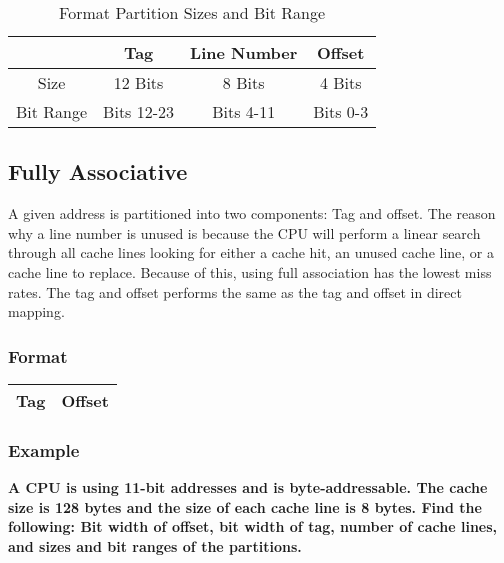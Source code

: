 \documentclass[11pt]{article}
\begin{document}
\begin{table}[H]
	\centering
	\caption*{Format Partition Sizes and Bit Range}
	\begin{tabular}{| c | c | c | c |}
		\hline
					&	Tag		&	Line Number		&	Offset\\
		\hline
		Size		&	12 Bits	&	8 Bits			&	4 Bits\\
		\hline
		Bit Range	&	Bits 12-23	&	Bits 4-11	&	Bits 0-3\\
		\hline
	\end{tabular}
\end{table}

\subsection{Fully Associative}

A given address is partitioned into two components: Tag and offset. The reason why a line number is unused is because the CPU will perform a linear search through all cache lines looking for either a cache hit, an unused cache line, or a cache line to replace. Because of this, using full association has the lowest miss rates. The tag and offset performs the same as the tag and offset in direct mapping.


\subsubsection{Format}

\begin{table}[H]
	\centering
	\begin{tabular}{| c | c |}
		\hline
		Tag			&		 Offset\\
		\hline
	\end{tabular}
\end{table}

\subsubsection{Example}

\textbf{A CPU is using 11-bit addresses and is byte-addressable. The cache size is 128 bytes and the size of each cache line is 8 bytes. Find the following: Bit width of offset, bit width of tag, number of cache lines, and sizes and bit ranges of the partitions.}
\end{document}
